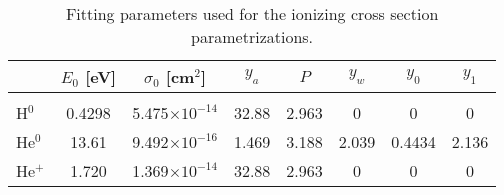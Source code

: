 
\begin{table}
\centering
\begin{tabular}{l | c c c c c c c }
    & $E_0$ [eV]  & $\sigma_0$ [cm$^2$] & $y_a$ & $P$ & $y_w$ & $y_0$ & $y_1$ \\
\hline\\[-0.5em]
H$^0$  & 0.4298 & 5.475$\times 10^{-14}$ & 32.88 & 2.963 & 0     & 0 & 0 \\
He$^0$ & 13.61  & 9.492$\times 10^{-16}$ & 1.469 & 3.188 & 2.039 & 0.4434 & 2.136 \\
He$^+$ & 1.720  & 1.369$\times 10^{-14}$ & 32.88 & 2.963 & 0     & 0 & 0 \\
\end{tabular}
\caption{Fitting parameters used for the ionizing cross section parametrizations.}
\label{tab:cross-sections}
\end{table}
